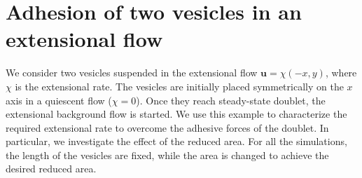 \documentclass[%
preprint,
 amsmath,amssymb,
 aps,
]{revtex4-1}
\newcommand{\uu}{\mathbf{u}}
\begin{document}
%
%
%
%
%

\newpage %
\section{Adhesion of two vesicles in an extensional flow} 
\label{sec:eflow} 
We consider two vesicles suspended in the extensional flow $\uu =
\chi(-x,y)$, where $\chi$ is the extensional rate.  The vesicles are
initially placed symmetrically on the $x$ axis in a quiescent flow
($\chi = 0$).  Once they reach steady-state doublet, the extensional
background flow is started.  We use this example to characterize the
required extensional rate to overcome the adhesive forces of the
doublet.  In particular, we investigate the effect of the reduced area.
For all the simulations, the length of the vesicles are fixed, while the
area is changed to achieve the desired reduced area.
\end{document}
